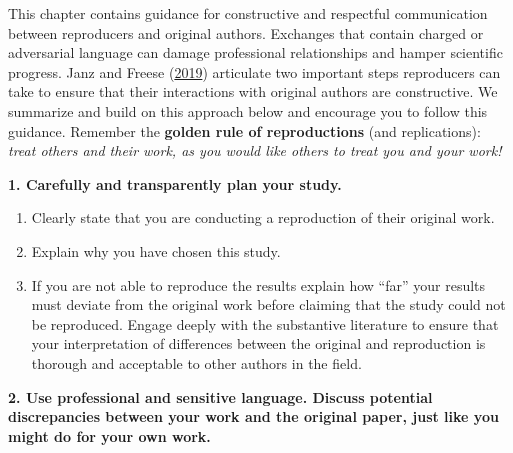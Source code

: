 \documentclass[
  openany]{book}
\providecommand{\tightlist}{%
  \setlength{\itemsep}{0pt}\setlength{\parskip}{0pt}}
\begin{document}
This chapter contains guidance for constructive and respectful communication between reproducers and original authors. Exchanges that contain charged or adversarial language can damage professional relationships and hamper scientific progress. Janz and Freese (\href{https://www.mzes.uni-mannheim.de/openscience/wp-content/uploads/2019/01/Janz-Freese_-Good-and-Bad-Replications-1.pdf}{2019}) articulate two important steps reproducers can take to ensure that their interactions with original authors are constructive. We summarize and build on this approach below and encourage you to follow this guidance. Remember the \textbf{golden rule of reproductions} (and replications): \emph{treat others and their work, as you would like others to treat you and your work!}

\textbf{1. Carefully and transparently plan your study.}

\begin{enumerate}
\def\labelenumi{\alph{enumi}.}
\tightlist
\item
  Clearly state that you are conducting a reproduction of their original work.\\
\item
  Explain why you have chosen this study.
\item
  If you are not able to reproduce the results explain how ``far'' your results must deviate from the original work before claiming that the study could not be reproduced. Engage deeply with the substantive literature to ensure that your interpretation of differences between the original and reproduction is thorough and acceptable to other authors in the field.
\end{enumerate}

\textbf{2. Use professional and sensitive language. Discuss potential discrepancies between your work and the original paper, just like you might do for your own work.}
\end{document}
